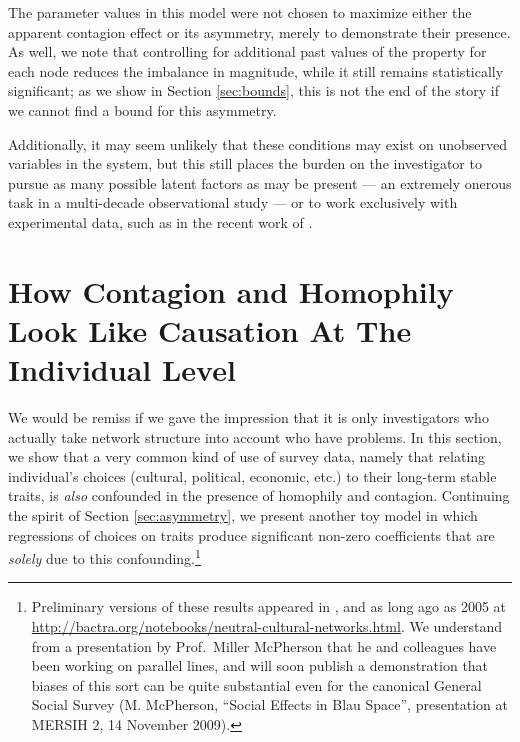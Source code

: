 \documentclass{article}
\begin{document}
\begin{multicols}{2}
The parameter values in this model were not chosen to maximize either the
apparent contagion effect or its asymmetry, merely to demonstrate their
presence. As well, we note that controlling for additional past values of the
property for each node reduces the imbalance in magnitude, while it still
remains statistically significant; as we show in Section \ref{sec:bounds}, this
is not the end of the story if we cannot find a bound for this asymmetry.

Additionally, it may seem unlikely that these conditions may exist on
unobserved variables in the system, but this still places the burden on the
investigator to pursue as many possible latent factors as may be present --- an
extremely onerous task in a multi-decade observational study --- or to work
exclusively with experimental data, such as in the recent work of
\citet{Fowler-Christakis-2010cbchsn}.

\section{How Contagion and Homophily Look Like Causation At The Individual Level}
\label{sec:contagion-fakes-causation}

We would be remiss if we gave the impression that it is only investigators who
actually take network structure into account who have problems.  In this
section, we show that a very common kind of use of survey data, namely that
relating individual's choices (cultural, political, economic, etc.) to their
long-term stable traits, is {\em also} confounded in the presence of homophily
and contagion.  Continuing the spirit of Section \ref{sec:asymmetry}, we
present another toy model in which regressions of choices on traits produce
significant non-zero coefficients that are {\em solely} due to this
confounding.\footnote{Preliminary versions of these results appeared in
  \citet{CRS-social-media}, and as long ago as 2005 at
  \url{http://bactra.org/notebooks/neutral-cultural-networks.html}.  We
  understand from a presentation by Prof.\ Miller McPherson that he and
  colleagues have been working on parallel lines, and will soon publish a
  demonstration that biases of this sort can be quite substantial even for the
  canonical General Social Survey (M. McPherson, ``Social Effects in Blau
  Space'', presentation at MERSIH 2, 14 November 2009).}


\end{multicols}
\end{document}
